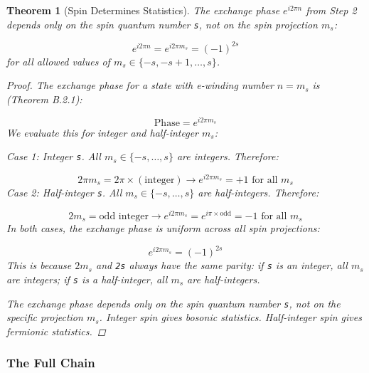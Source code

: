 \documentclass[aps,prd,preprint,superscriptaddress,longbibliography,floatfix]{revtex4-2}
\newtheorem{theorem}{Theorem}[section]
\theoremstyle{remark}
\begin{document}
\begin{theorem}[Spin Determines Statistics]
\label{thm:B33} \textit{The exchange phase $e^{i2\pi n}$ from Step 2 depends only on the spin quantum number \texttt{s}, not on the spin projection $m_s$:}


\begin{equation}
    e^{i2\pi n} = e^{i2\pi m_s} = (-1)^{2s}
\end{equation}
\textit{for all allowed values of $m_s \in \{-s, -s+1, \ldots, s\}$.}

\begin{proof}

The exchange phase for a state with e-winding number $n = m_s$ is (Theorem B.2.1):


\begin{equation}
    \text{Phase} = e^{i2\pi m_s}
\end{equation}
We evaluate this for integer and half-integer $m_s$:

\textit{Case 1: Integer \texttt{s}.} All $m_s \in \{-s, \ldots, s\}$ are integers. Therefore:


\begin{equation}
    2\pi m_s = 2\pi \times (\text{integer}) \to e^{i2\pi m_s} = +1 \text{ for all } m_s
\end{equation}
\textit{Case 2: Half-integer \texttt{s}.} All $m_s \in \{-s, \ldots, s\}$ are half-integers. Therefore:


\begin{equation}
    2m_s = \text{odd integer} \to e^{i2\pi m_s} = e^{i\pi \times \text{odd}} = -1 \text{ for all } m_s
\end{equation}
In both cases, the exchange phase is uniform across all spin projections:


\begin{equation}
    e^{i2\pi m_s} = (-1)^{2s}
\end{equation}
This is because $2m_s$ and \texttt{2s} always have the same parity: if \texttt{s} is an integer, all $m_s$ are integers; if \texttt{s} is a half-integer, all $m_s$ are half-integers.

The exchange phase depends only on the spin quantum number \texttt{s}, not on the specific projection $m_s$. Integer spin gives bosonic statistics. Half-integer spin gives fermionic statistics. \end{proof}
\end{theorem}

\subsubsection{The Full Chain}
\end{document}
